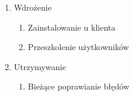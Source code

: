 \begin{enumerate}
\begin{enumerate}
\begin{enumerate}
\end{enumerate}
\item Wdrożenie

\begin{enumerate}

\item Zainstalowanie u klienta
\item Przeszkolenie użytkowników

\end{enumerate}
\item Utrzymywanie

\begin{enumerate}

\item Bieżące poprawianie błędów

\end{enumerate}
\end{enumerate}
\end{enumerate}





